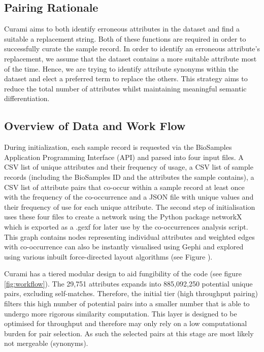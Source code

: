 \documentclass{bmcart}
\begin{document}
\subsection*{Pairing Rationale}

Curami aims to both identify erroneous attributes in the dataset and find a suitable a replacement string. Both of these functions are required in order to successfully curate the sample record. In order to identify an erroneous attribute's replacement, we assume that the dataset contains a more suitable attribute most of the time. Hence, we are trying to identify attribute synonyms within the dataset and elect a preferred term to replace the others. This strategy aims to reduce the total number of attributes whilst maintaining meaningful semantic differentiation.

\subsection*{Overview of Data and Work Flow}

During initialization, each sample record is requested via the BioSamples Application Programming Interface (API) and parsed into four input files. A CSV list of unique attributes and their frequency of usage, a CSV list of sample records (including the BioSamples ID and the attributes the sample contains), a CSV list of attribute pairs that co-occur within a sample record at least once with the frequency of the co-occurrence and a JSON file with unique values and their frequency of use for each unique attribute. The second step of initialisation uses these four files to create a network using the Python package networkX \cite{networkx} which is exported as a .gexf for later use by the co-occurrences analysis script. This graph contains nodes representing individual attributes and weighted edges with co-occurrence can also be instantly visualised using Gephi \cite{bastian2009gephi} and explored using various inbuilt force-directed layout algorithms \cite{jacomy2014forceatlas2} (see Figure \cite{fig:gephi}).

Curami has a tiered modular design to aid fungibility of the code (see figure \ref{fig:workflow}). The 29,751 attributes expands into 885,092,250 potential unique pairs, excluding self-matches. Therefore, the initial tier (high throughput pairing) filters this high number of potential pairs into a smaller number that is able to undergo more rigorous similarity computation. This layer is designed to be optimised for throughput and therefore may only rely on a low computational burden for pair selection. As such the selected pairs at this stage are most likely not mergeable (synonyms).
\end{document}
